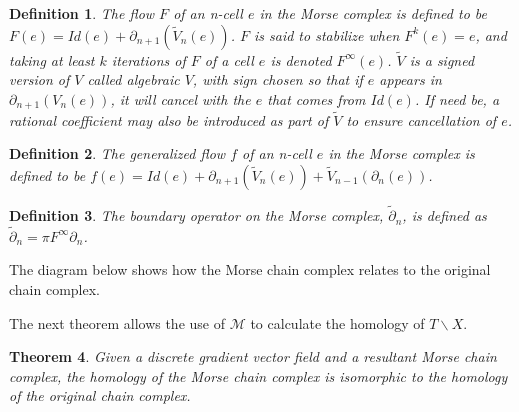 \documentclass{amsart}
\newtheorem{theorem}{Theorem}[section]
\newtheorem{Definition}[theorem]{Definition}
\begin{document}
\begin{Definition}
	The flow $F$ of an n-cell $e$ in the Morse complex is defined to be $F(e) = Id(e) + \partial_{n+1}(\widetilde{V}_{n}(e))$. $F$ is said to \textit{stabilize} when $F^{k}(e) = e$, and taking at least $k$ iterations of $F$ of a cell $e$ is denoted $F^{\infty}(e)$. $\widetilde{V}$ is a signed version of $V$ called algebraic $V$, with sign chosen so that if $e$ appears in $\partial_{n+1}(V_{n}(e))$, it will cancel with the $e$ that comes from $Id(e)$. If need be, a rational coefficient may also be introduced as part of $\widetilde{V}$ to ensure cancellation of $e$.
\end{Definition}

\begin{Definition}
	The generalized flow $f$ of an n-cell $e$ in the Morse complex is defined to be $f(e) = Id(e) + \partial_{n+1}(\widetilde{V}_{n}(e)) + \widetilde{V}_{n-1}(\partial_{n}(e))$.
\end{Definition}

\begin{Definition}
	The boundary operator on the Morse complex, $\widetilde{\partial}_{n}$, is defined as $\widetilde{\partial}_{n} = \pi F^{\infty} \partial_{n}$.
\end{Definition}

The diagram below shows how the Morse chain complex relates to the original chain complex.

\bigskip 															

\begin{center}


\end{center}

\bigskip

The next theorem allows the use of $\mathcal{M}$ to calculate the homology of $T\backslash X$.

\begin{theorem}
	Given a discrete gradient vector field and a resultant Morse chain complex, the homology of the Morse chain complex is isomorphic to the homology of the original chain complex.
\end{theorem}
\end{document}
